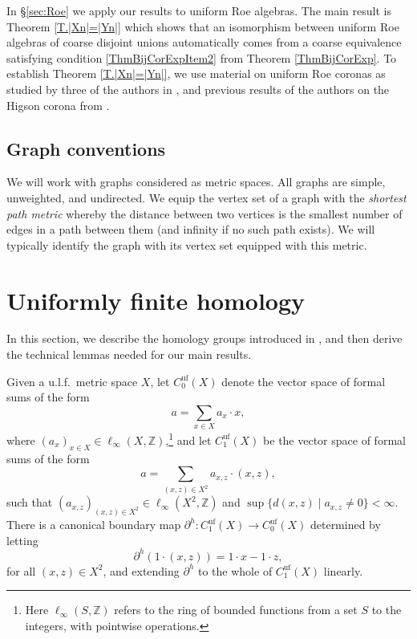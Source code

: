 \documentclass[11pt]{amsart}
\newcommand{\Z}{\mathbb{Z}}
\newcommand{\cstu}{\mathrm{C}^*_u}
\numberwithin{equation}{section}
\theoremstyle{definition}
\theoremstyle{remark}
\numberwithin{equation}{section}
\newcommand{\barh}{\partial^h}
\begin{document}
 In \S\ref{sec:Roe} we apply our results to uniform Roe algebras.  The main result is Theorem \ref{T.|Xn|=|Yn|} which shows that an isomorphism between uniform Roe algebras of coarse disjoint unions automatically comes from a coarse equivalence satisfying condition \eqref{ThmBijCorExpItem2} from Theorem \ref{ThmBijCorExp}.  To establish Theorem \ref{T.|Xn|=|Yn|}, we use material on uniform Roe coronas as studied by three of the authors in \cite{BragaFarahVignati2018AdvMath}, and previous results of the authors on the Higson corona from \cite[Proposition 3.6]{BaudierBragaFarahVignatiWillett2023}.
 
 
 \subsection*{Graph conventions}
 
 We will work with graphs considered as metric spaces.  All graphs are simple, unweighted, and undirected. We equip the vertex set of a graph with the \emph{shortest path metric} whereby the distance between two vertices is the smallest number of edges in a path between them (and infinity if no such path exists).  We will typically identify the graph with its vertex set equipped with this metric.
 


\section{Uniformly finite homology}\label{SectionUULHomology}

In this section, we describe the homology groups introduced in \cite{Whyte1999Duke}, and then derive the technical lemmas needed for our main results.

 Given a u.l.f.\ metric space $X$, let $C_0^{\textrm{uf}}(X)$ denote the vector space of formal sums of the form 
\[
a=\sum_{x\in X}a_x\cdot x,
\]
where $(a_x)_{x\in X}\in \ell_\infty(X,\Z)$,\footnote{Here $\ell_\infty(S,\Z)$ refers to the ring of bounded functions from a set $S$ to the integers, with pointwise operations.} and let $C_1^{\textrm{uf}}(X)$ be the vector space of formal sums of the form 
\[
a=\sum_{(x,z)\in X^2}a_{x,z}\cdot (x,z),
\]
such that $(a_{x,z})_{(x,z)\in X^2}\in \ell_\infty(X^2,\Z)$ and $\sup\{d(x,z)\mid a_{x,z}\neq 0\}<\infty$. There is a canonical boundary map $ \barh \colon C_1^{\textrm{uf}}(X)\to C_0^{\textrm{uf}}(X)$ determined by letting 
\[
\barh (1\cdot (x,z))=1\cdot x-1\cdot z,
\]
for all $(x,z)\in X^2$, and extending $\barh $ to the whole of $C_1^{\textrm{uf}}(X)$ linearly. 
\end{document}
